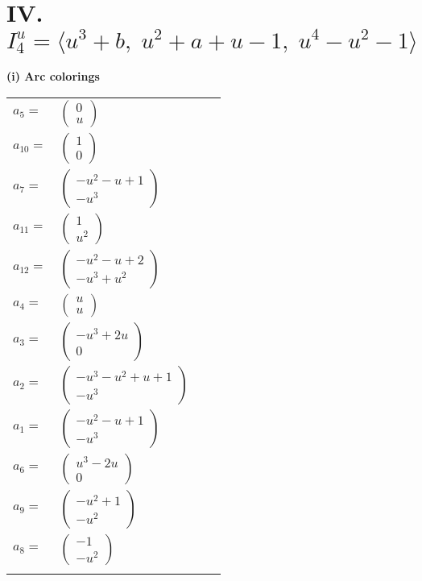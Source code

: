 \documentclass[1p]{elsarticle_modified}
\theoremstyle{definition}
\begin{document}
\centering \section*{IV. $I^u_{4}= \langle u^3+b,\;u^2+a+u-1,\;u^4- u^2-1 \rangle$}
\flushleft \textbf{(i) Arc colorings}\\
\begin{tabular}{m{7pt} m{180pt} m{7pt} m{180pt} }
\flushright $a_{5}=$&$\begin{pmatrix}0\\u\end{pmatrix}$ \\
\flushright $a_{10}=$&$\begin{pmatrix}1\\0\end{pmatrix}$ \\
\flushright $a_{7}=$&$\begin{pmatrix}- u^2- u+1\\- u^3\end{pmatrix}$ \\
\flushright $a_{11}=$&$\begin{pmatrix}1\\u^2\end{pmatrix}$ \\
\flushright $a_{12}=$&$\begin{pmatrix}- u^2- u+2\\- u^3+u^2\end{pmatrix}$ \\
\flushright $a_{4}=$&$\begin{pmatrix}u\\u\end{pmatrix}$ \\
\flushright $a_{3}=$&$\begin{pmatrix}- u^3+2 u\\0\end{pmatrix}$ \\
\flushright $a_{2}=$&$\begin{pmatrix}- u^3- u^2+u+1\\- u^3\end{pmatrix}$ \\
\flushright $a_{1}=$&$\begin{pmatrix}- u^2- u+1\\- u^3\end{pmatrix}$ \\
\flushright $a_{6}=$&$\begin{pmatrix}u^3-2 u\\0\end{pmatrix}$ \\
\flushright $a_{9}=$&$\begin{pmatrix}- u^2+1\\- u^2\end{pmatrix}$ \\
\flushright $a_{8}=$&$\begin{pmatrix}-1\\- u^2\end{pmatrix}$\\&\end{tabular}
\end{document}
